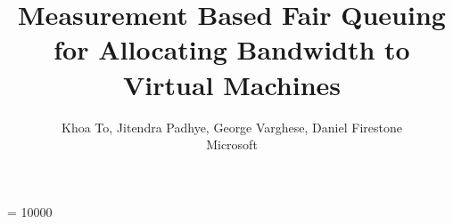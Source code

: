 \documentclass[10pt]{sig-alternate-05-2015}
\begin{document}

\widowpenalty = 10000

\title{Measurement Based Fair Queuing for Allocating Bandwidth to Virtual Machines}

\author{Khoa To, Jitendra Padhye, George Varghese, Daniel Firestone \\ Microsoft}

\maketitle









\end{document}
